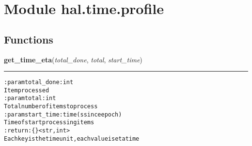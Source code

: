 %
%
%


\section{Module hal.time.profile}

    \label{hal:time:profile}


  \subsection{Functions}

    \label{hal:time:profile:get_time_eta}

    \vspace{0.5ex}

\hspace{.8\funcindent}\begin{boxedminipage}{\funcwidth}

    \raggedright \textbf{get\_time\_eta}(\textit{total\_done}, \textit{total}, \textit{start\_time})

    \vspace{-1.5ex}

    \rule{\textwidth}{0.5\fboxrule}
\setlength{\parskip}{2ex}
\begin{alltt}

:param total\_done: int
    Item processed
:param total: int
    Total number of items to process
:param start\_time: time (s since epoch)
    Time of start processing items
:return: \{\} {\textless}str, int{\textgreater}
    Each key is the time unit, each value is eta time
\end{alltt}

\setlength{\parskip}{1ex}
    \end{boxedminipage}


